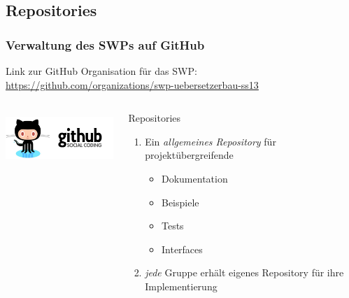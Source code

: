 \documentclass[ucs,9pt]{beamer}
\begin{document}
\subsection{Repositories}
\begin{frame}
    \frametitle{Verwaltung des SWPs auf GitHub}
    Link zur GitHub Organisation für das SWP:
    \url{https://github.com/organizations/swp-uebersetzerbau-ss13}
  \begin{columns}
    \begin{column}{0.5\textwidth}
  \begin{center}
    \includegraphics[height=2cm]{githuboctacat}
  \end{center}
\end{column}
    \begin{column}{0.5\textwidth}
  \begin{block}{Repositories}
      \begin{enumerate}
          \item Ein \emph{allgemeines Repository} für projektübergreifende
              \begin{itemize}
                  \item Dokumentation
                  \item Beispiele
                  \item Tests
                  \item Interfaces
              \end{itemize}
          \item \emph{jede} Gruppe erhält eigenes Repository für ihre
              Implementierung
      \end{enumerate}
  \end{block}
\end{column}
  \end{columns}
\end{frame}
\end{document}
